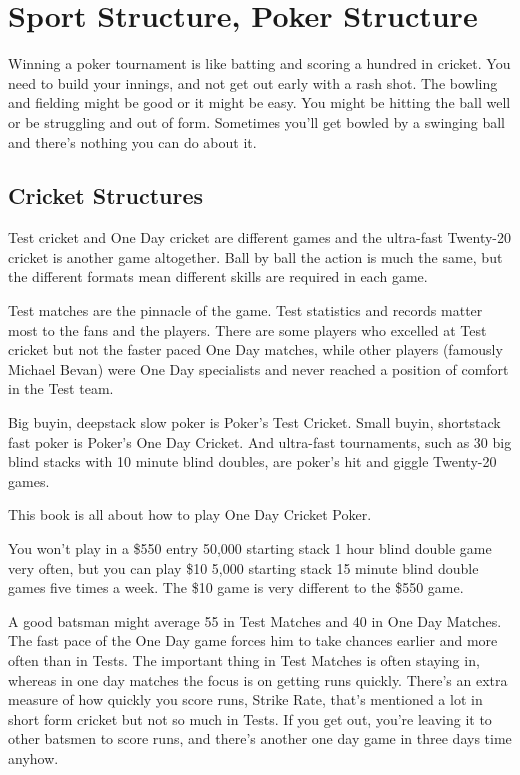 \chapter{Sport Structure, Poker Structure}



Winning a poker tournament is like batting and scoring a hundred in cricket.
You need to build your innings, and not get out early
with a rash shot. The bowling and fielding might be good or it might
be easy. You might be hitting the ball well or be struggling and out
of form. Sometimes you'll get bowled by a swinging ball and
there's nothing you can do about it.

\section{Cricket Structures}

Test cricket and One Day cricket are different games and the ultra-fast
Twenty-20 cricket is another game altogether. Ball by ball the
action is much the same, but the different formats mean
different skills are required in each game.

Test matches are the pinnacle of the game. Test statistics and records
matter most to the fans and the players. There are some players who excelled
at Test cricket but not the faster paced One Day matches, while
other players (famously Michael Bevan) were One Day
specialists and never reached a position of comfort in the Test team.

Big buyin, deepstack slow poker is Poker's Test Cricket.
Small buyin, shortstack fast poker is Poker's One Day Cricket.
And ultra-fast tournaments, such as 30 big blind stacks with 10 minute
blind doubles, are poker's hit and giggle Twenty-20 games.

This book is all about how to play One Day Cricket Poker.

You won't play in a \$550 entry 50,000 starting stack 1 hour blind double
game very often, but you can play \$10 5,000 starting stack 15 minute
blind double games five times a week. The \$10 game is very
different to the \$550 game.

A good batsman might average 55 in Test Matches and 40 in One Day
Matches. The fast pace of the One Day game forces him to take
chances earlier and more often than in Tests. The important thing in
Test Matches is often staying in, whereas in one day matches
the focus is on getting runs quickly. There's an extra
measure of how quickly you score runs, Strike Rate, that's mentioned
a lot in short form cricket but not so much in Tests. If you get out,
you're leaving it to other batsmen to score runs, and there's another
one day game in three days time anyhow.

